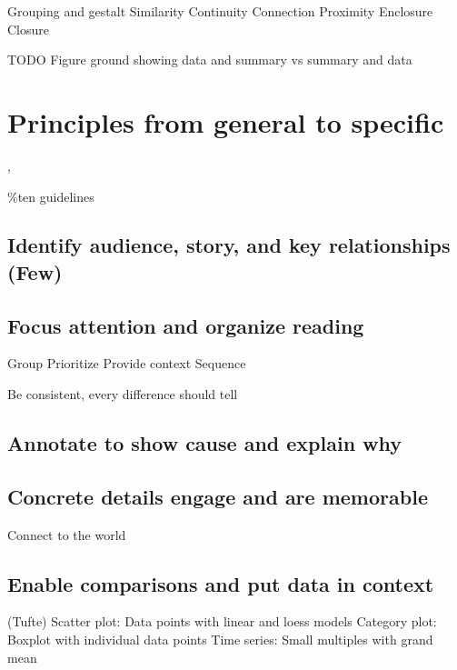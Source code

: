 \documentclass[]{krantz}
\theoremstyle{definition}
\theoremstyle{definition}
\theoremstyle{definition}
\theoremstyle{remark}
\begin{document}
Grouping and gestalt Similarity Continuity Connection Proximity
Enclosure Closure

TODO Figure ground showing data and summary vs summary and data

\section{Principles from general to
specific}\label{principles-from-general-to-specific}

\citep{Tufte1983}, \citep[\citet{Gelman2013a}]{Munzner2014}

\%ten guidelines \citep{Kelleher2011a}

\subsection{Identify audience, story, and key relationships
(Few)}\label{identify-audience-story-and-key-relationships-few}

\subsection{Focus attention and organize
reading}\label{focus-attention-and-organize-reading}

Group Prioritize Provide context Sequence

Be consistent, every difference should tell

\subsection{Annotate to show cause and explain
why}\label{annotate-to-show-cause-and-explain-why}

\subsection{Concrete details engage and are
memorable}\label{concrete-details-engage-and-are-memorable}

Connect to the world

\subsection{Enable comparisons and put data in
context}\label{enable-comparisons-and-put-data-in-context}

(Tufte) Scatter plot: Data points with linear and loess models Category
plot: Boxplot with individual data points Time series: Small multiples
with grand mean
\end{document}
